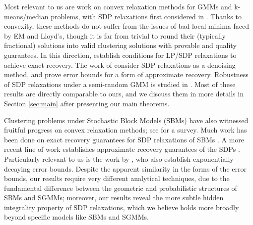 Most relevant to us are work on convex relaxation methods for GMMs
and k-means/median problems, with SDP relaxations first considered
in \citet{peng2005new,peng2007approximating}. Thanks to convexity,
these methods do not suffer from the issues of bad local minima faced
by EM and Lloyd's, though it is far from trivial to round their (typically
fractional) solutions into valid clustering solutions with provable
and quality guarantees. In this direction, \citet{awasthi2015relax,li2017kmeans}
establish conditions for LP/SDP relaxations to achieve exact recovery.
The work of \citet{mixon2017clustering} consider SDP relaxations
as a denoising method, and prove error bounds for a form of approximate
recovery. Robustness of SDP relaxations under a semi-random GMM is
studied in \citet{awasthi2017clustering}. Most of these results are
directly comparable to ours, and we discuss them in more details in
Section \ref{sec:main} after presenting our main theorems.

Clustering problems under Stochastic Block Models (SBMs) have also
witnessed fruitful progress on convex relaxation methods; see \citet{abbe2016recent}
for a survey. Much work has been done on exact recovery guarantees
for SDP relaxations of SBMs \citep{krivelevich2006coloring,oymak2011finding,amini2014semidefinite,ames2014convex,chen2012sparseclustering}.
A more recent line of work establishes approximate recovery guarantees
of the SDPs \citep{Guedon2015,MontanariSen16}. Particularly relevant
to us is the work by \citet{fei2017exponential}, who also establish
exponentially decaying error bounds. Despite the apparent similarity
in the forms of the error bounds, our results require very different
analytical techniques, due to the fundamental difference between the
geometric and probabilistic structures of SBMs and SGMMs; moreover,
our results reveal the more subtle hidden integrality property of
SDP relaxations, which we believe holds more broadly beyond specific
models like SBMs and SGMMs.


